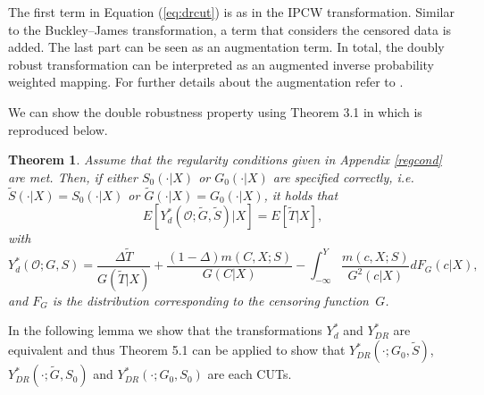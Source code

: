 \documentclass[12pt, a4paper]{scrartcl}
\theoremstyle{definition}
\theoremstyle{plain}
\newtheorem{Theorem}{Theorem}[section]
\numberwithin{equation}{section}
\numberwithin{figure}{section}
\numberwithin{table}{section}
\begin{document}
	The first term in Equation (\ref{eq:drcut}) is as in the IPCW transformation.
	Similar to the Buckley--James transformation, a term that considers the censored data is added.
	The last part can be seen as an augmentation term.
	In total, the doubly robust transformation can be interpreted as an augmented inverse probability weighted mapping.
	For further details about the augmentation refer to \citet*{bookfailuretime}.
		
	We can show the double robustness property using Theorem 3.1 in \citet*{drcut} which is reproduced below.
	
	\begin{Theorem}\label{thm:dr}
		Assume that the regularity conditions given in Appendix \ref{regcond} are met.
		Then, if either $S_0(\cdot\vert X)$ or $G_0(\cdot\vert X)$ are specified correctly, i.e. $\tilde{S}(\cdot\vert X)=S_0(\cdot\vert X)$ or $\tilde{G}(\cdot\vert X)=G_0(\cdot\vert X)$, it holds that
		\begin{equation*}
		E[Y_{d}^*(\mathcal{O};\tilde{G}, \tilde{S})\vert X] = E[\tilde T \vert X],
		\end{equation*}
		with 
		\begin{equation}\label{eq:drcut2}
		Y_d^*(\mathcal{O}; G,S) = \frac{\Delta \tilde T}{G(\tilde T\vert X)}+\frac{(1-\Delta)m(C,X;S)}{G(C \vert X)}-\int_{-\infty}^{Y}\frac{m(c,X;S)}{G^2(c\vert X)}dF_G(c\vert X),
		\end{equation}
		and $F_G$ is the distribution corresponding to the censoring function~$G$.
	\end{Theorem}
	In the following lemma we show that the transformations $Y_d^*$ and $Y_{DR}^*$ are equivalent and thus Theorem 5.1 can be applied to show that $Y_{DR}^*(\cdot; G_0, \tilde{S})$, $Y_{DR}^*(\cdot; \tilde{G}, S_0)$ and $Y_{DR}^*(\cdot; G_0, S_0)$ are each CUTs.
	
\end{document}
